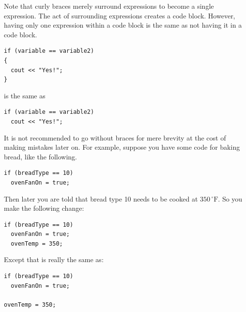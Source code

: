 
Note that curly braces merely surround expressions to become a single expression.
The act of surrounding expressions creates a code block.
However, having only one expression within a code block is the same as not having it in a code block.

\noindent\begin{minipage}{\linewidth}\begin{lstlisting}
if (variable == variable2)
{
  cout << "Yes!";
}
\end{lstlisting}\end{minipage}

\noindent is the same as

\noindent\begin{minipage}{\linewidth}\begin{lstlisting}
if (variable == variable2)
  cout << "Yes!";
\end{lstlisting}\end{minipage}

It is not recommended to go without braces for mere brevity at the cost of making mistakes later on.
For example, suppose you have some code for baking bread, like the following.

\noindent\begin{minipage}{\linewidth}\begin{lstlisting}
if (breadType == 10)
  ovenFanOn = true;
\end{lstlisting}\end{minipage}

Then later you are told that bread type 10 needs to be cooked at $350\,^{\circ}\mathrm{F}$.
So you make the following change:

\noindent\begin{minipage}{\linewidth}\begin{lstlisting}
if (breadType == 10)
  ovenFanOn = true;
  ovenTemp = 350;
\end{lstlisting}\end{minipage}

Except that is really the same as:  \nopagebreak[4]

\noindent\begin{minipage}{\linewidth}\begin{lstlisting}
if (breadType == 10)
  ovenFanOn = true;

ovenTemp = 350;
\end{lstlisting}\end{minipage}

